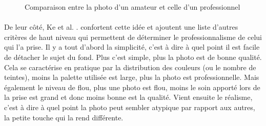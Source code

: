 \documentclass[11pt, french]{report-rd-info}
\begin{document}
\begin{figure}[htp]
 \caption{Comparaison entre la photo d'un amateur et celle d'un professionnel\cite{Ke}}
 \label{fig:ComparaisonPhotosAmateurPro}
\end{figure}
\paragraph*{}
\label{crit:both}
De leur côté, Ke et al. . \cite{Ke}  confortent cette idée et ajoutent une liste d’autres critères de haut niveau qui permettent de déterminer le professionnalisme de celui qui l’a prise. Il y a tout d’abord la simplicité, c'est à dire à quel point il est facile de détacher le sujet du fond. Plus c'est simple, plus la photo est de bonne qualité. Cela se caractérise en pratique par la distribution des couleurs (ou le nombre de teintes), moins la palette utilisée est large, plus la photo est professionnelle. Mais également le niveau de flou, plus une photo est flou, moins le soin apporté lors de la prise est grand et donc moins bonne est la qualité.
Vient ensuite le réalisme, c'est à dire à quel point la photo peut sembler atypique par rapport aux autres, la petite touche qui la rend différente.
\end{document}

